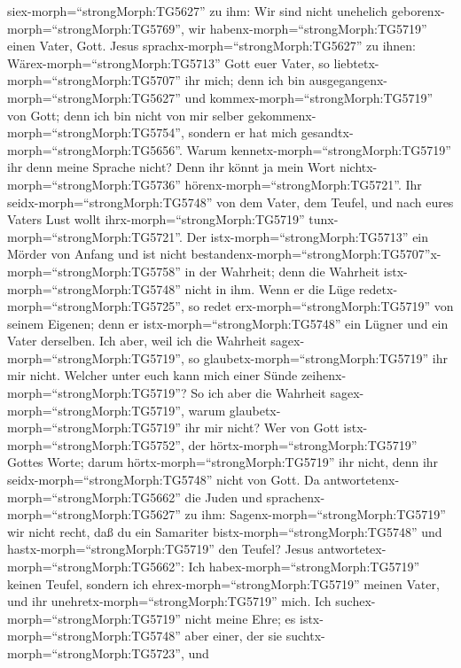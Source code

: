 siex-morph=``strongMorph:TG5627'' zu ihm: Wir sind nicht unehelich
geborenx-morph=``strongMorph:TG5769'', wir
habenx-morph=``strongMorph:TG5719'' einen Vater, Gott. 
Jesus sprachx-morph=``strongMorph:TG5627'' zu ihnen:
Wärex-morph=``strongMorph:TG5713'' Gott euer Vater, so
liebtetx-morph=``strongMorph:TG5707'' ihr mich; denn ich bin
ausgegangenx-morph=``strongMorph:TG5627'' und
kommex-morph=``strongMorph:TG5719'' von Gott; denn ich bin nicht von mir
selber gekommenx-morph=``strongMorph:TG5754'', sondern er hat mich
gesandtx-morph=``strongMorph:TG5656''.  Warum
kennetx-morph=``strongMorph:TG5719'' ihr denn meine Sprache nicht? Denn
ihr könnt ja mein Wort nichtx-morph=``strongMorph:TG5736''
hörenx-morph=``strongMorph:TG5721''.  Ihr
seidx-morph=``strongMorph:TG5748'' von dem Vater, dem Teufel, und nach
eures Vaters Lust wollt ihrx-morph=``strongMorph:TG5719''
tunx-morph=``strongMorph:TG5721''. Der istx-morph=``strongMorph:TG5713''
ein Mörder von Anfang und ist nicht
bestandenx-morph=``strongMorph:TG5707''\textbar x-morph=``strongMorph:TG5758''
in der Wahrheit; denn die Wahrheit istx-morph=``strongMorph:TG5748''
nicht in ihm. Wenn er die Lüge redetx-morph=``strongMorph:TG5725'', so
redet erx-morph=``strongMorph:TG5719'' von seinem Eigenen; denn er
istx-morph=``strongMorph:TG5748'' ein Lügner und ein Vater derselben.
 Ich aber, weil ich die Wahrheit
sagex-morph=``strongMorph:TG5719'', so
glaubetx-morph=``strongMorph:TG5719'' ihr mir nicht. 
Welcher unter euch kann mich einer Sünde
zeihenx-morph=``strongMorph:TG5719''? So ich aber die Wahrheit
sagex-morph=``strongMorph:TG5719'', warum
glaubetx-morph=``strongMorph:TG5719'' ihr mir nicht?  Wer
von Gott istx-morph=``strongMorph:TG5752'', der
hörtx-morph=``strongMorph:TG5719'' Gottes Worte; darum
hörtx-morph=``strongMorph:TG5719'' ihr nicht, denn ihr
seidx-morph=``strongMorph:TG5748'' nicht von Gott.  Da
antwortetenx-morph=``strongMorph:TG5662'' die Juden und
sprachenx-morph=``strongMorph:TG5627'' zu ihm:
Sagenx-morph=``strongMorph:TG5719'' wir nicht recht, daß du ein
Samariter bistx-morph=``strongMorph:TG5748'' und
hastx-morph=``strongMorph:TG5719'' den Teufel?  Jesus
antwortetex-morph=``strongMorph:TG5662'': Ich
habex-morph=``strongMorph:TG5719'' keinen Teufel, sondern ich
ehrex-morph=``strongMorph:TG5719'' meinen Vater, und ihr
unehretx-morph=``strongMorph:TG5719'' mich.  Ich
suchex-morph=``strongMorph:TG5719'' nicht meine Ehre; es
istx-morph=``strongMorph:TG5748'' aber einer, der sie
suchtx-morph=``strongMorph:TG5723'', und
